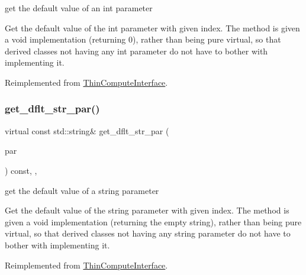 get the default value of an int parameter 

Get the default value of the int parameter with given index. The method is given a void implementation (returning 0), rather than being pure virtual, so that derived classes not having any int parameter do not have to bother with implementing it. 

Reimplemented from \mbox{\hyperlink{class_s_m_spp__di__unipi__it_1_1_thin_compute_interface_aee367363e42f86be5376165878f958f5}{Thin\+Compute\+Interface}}.

\mbox{\label{class_s_m_spp__di__unipi__it_1_1_f_row_constraint_a4d332ec2a836a87b0bd3b3539752e89f}} 
\subsubsection{\texorpdfstring{get\+\_\+dflt\+\_\+str\+\_\+par()}{get\_dflt\_str\_par()}}
{\footnotesize\ttfamily virtual const std\+::string\& get\+\_\+dflt\+\_\+str\+\_\+par (\begin{DoxyParamCaption}\item[{const \mbox{\hyperlink{class_s_m_spp__di__unipi__it_1_1_thin_compute_interface_aa3d710629ad8c434286726ad810c3b47}{idx\+\_\+type}}}]{par }\end{DoxyParamCaption}) const\hspace{0.3cm}{\ttfamily [inline]}, {\ttfamily [override]}, {\ttfamily [virtual]}}



get the default value of a string parameter 

Get the default value of the string parameter with given index. The method is given a void implementation (returning the empty string), rather than being pure virtual, so that derived classes not having any string parameter do not have to bother with implementing it. 

Reimplemented from \mbox{\hyperlink{class_s_m_spp__di__unipi__it_1_1_thin_compute_interface_a0b058687744cfc2e91a20187c56566ca}{Thin\+Compute\+Interface}}.

